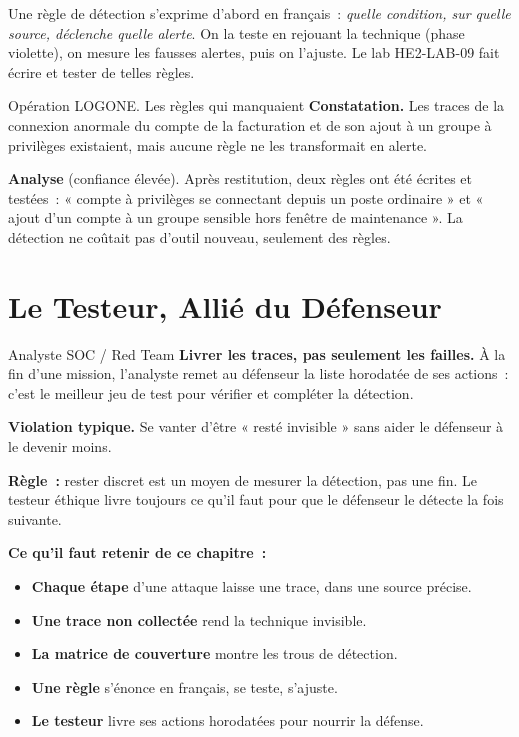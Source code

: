 Une règle de détection s'exprime d'abord en français~: \emph{quelle
condition, sur quelle source, déclenche quelle alerte}. On la teste en
rejouant la technique (phase violette), on mesure les fausses alertes, puis
on l'ajuste. Le lab HE2-LAB-09 fait écrire et tester de telles règles.

\begin{boxscenario}{Opération LOGONE. Les règles qui manquaient}
\textbf{Constatation.} Les traces de la connexion anormale du compte de la
facturation et de son ajout à un groupe à privilèges existaient, mais aucune
règle ne les transformait en alerte.

\medskip
\textbf{Analyse} (confiance élevée). Après restitution, deux règles ont été
écrites et testées~: « compte à privilèges se connectant depuis un poste
ordinaire » et « ajout d'un compte à un groupe sensible hors fenêtre de
maintenance ». La détection ne coûtait pas d'outil nouveau, seulement des
règles.
\end{boxscenario}

\section{Le Testeur, Allié du Défenseur}
\label{sec:c21-allie}

\begin{boxmetier}{Analyste SOC / Red Team}
\textbf{Livrer les traces, pas seulement les failles.} À la fin d'une
mission, l'analyste remet au défenseur la liste horodatée de ses actions~:
c'est le meilleur jeu de test pour vérifier et compléter la détection.
\end{boxmetier}

\begin{boxalert}
\textbf{Violation typique.} Se vanter d'être « resté invisible » sans aider
le défenseur à le devenir moins.

\smallskip
\textbf{Règle~:} rester discret est un moyen de mesurer la détection, pas une
fin. Le testeur éthique livre toujours ce qu'il faut pour que le défenseur
le détecte la fois suivante.
\end{boxalert}

\separateur

\begin{boxresume}
\textbf{Ce qu'il faut retenir de ce chapitre~:}
\begin{itemize}
    \item \textbf{Chaque étape} d'une attaque laisse une trace, dans une
          source précise.
    \item \textbf{Une trace non collectée} rend la technique invisible.
    \item \textbf{La matrice de couverture} montre les trous de détection.
    \item \textbf{Une règle} s'énonce en français, se teste, s'ajuste.
    \item \textbf{Le testeur} livre ses actions horodatées pour nourrir la
          défense.
\end{itemize}
\end{boxresume}

